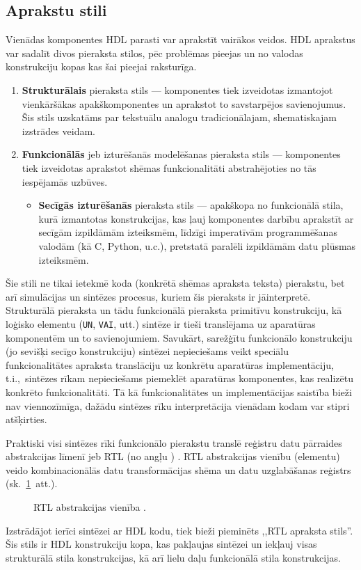 \subsection{Aprakstu stili} \label{sec:hdl-styles}
Vienādas komponentes HDL parasti var aprakstīt vairākos veidos.
HDL aprakstus var sadalīt divos pieraksta stilos, pēc problēmas pieejas un
no valodas konstrukciju kopas kas šai pieejai raksturīga.
\begin{enumerate}
	\item \textbf{Strukturālais} pieraksta stils --- komponentes tiek
		izveidotas izmantojot vienkāršākas apakškomponentes un aprakstot 
		to savstarpējos
		savienojumus. Šis stils uzskatāms par tekstuālu analogu
		tradicionālajam, shematiskajam izstrādes veidam.
	\item \textbf{Funkcionālās} jeb izturēšanās modelēšanas pieraksta
		stils --- komponentes tiek izveidotas aprakstot shēmas funkcionalitāti
		abstrahējoties no tās iespējamās uzbūves.
	\begin{itemize}
		\item \textbf{Secīgās izturēšanās} pieraksta stils --- apakškopa
			no funkcionālā stila, kurā izmantotas konstrukcijas, kas ļauj
			komponentes darbību aprakstīt ar secīgām izpildāmām izteiksmēm,
			līdzīgi imperatīvām programmēšanas valodām (kā C, Python, u.c.),
			pretstatā paralēli izpildāmām datu plūsmas izteiksmēm.
	\end{itemize}
\end{enumerate}

Šie stili ne tikai ietekmē koda (konkrētā shēmas apraksta teksta) pierakstu,
bet arī simulācijas un sintēzes procesus, kuriem šis pieraksts ir jāinterpretē.
Strukturālā pieraksta un tādu funkcionālā pieraksta primitīvu konstrukciju,
kā loģisko elementu (\texttt{UN}, \texttt{VAI}, utt.)
sintēze ir tieši translējama uz aparatūras komponentēm un to savienojumiem.
Savukārt, sarežģītu funkcionālo konstrukciju (jo sevišķi secīgo
konstrukciju) sintēzei nepieciešams veikt speciālu funkcionalitātes apraksta
translāciju uz konkrētu aparatūras implementāciju, t.i.,~sintēzes rīkam nepieciešams
piemeklēt aparatūras komponentes, kas realizētu konkrēto funkcionalitāti.
Tā kā funkcionalitātes un implementācijas saistība bieži nav viennozīmīga,
dažādu sintēzes rīku interpretācija vienādam kodam var stipri atšķirties.

Praktiski visi sintēzes rīki funkcionālo pierakstu translē %
reģistru datu pārraides abstrakcijas līmenī jeb RTL
(no angļu ) \cite[2.~lpp.]{HDL}%
\cite[235.~lpp.]{Perry-VHDL}.
RTL abstrakcijas vienību (elementu) veido kombinacionālās datu transformācijas shēma un
datu uzglabāšanas reģistrs (sk.~\ref{fig:rtl}~att.).
\begin{figure}[thb]
	\centering
	\def\svgscale{1.25}
	
	\caption[RTL abstrakcijas vienība.]{RTL abstrakcijas vienība \cite[233.~lpp.]{Perry-VHDL}.}
	\label{fig:rtl}
\end{figure}
Izstrādājot ierīci sintēzei ar HDL kodu, tiek bieži pieminēts
,,RTL apraksta stils''. Šis stils ir HDL konstrukciju kopa, kas
pakļaujas sintēzei un iekļauj visas strukturālā stila konstrukcijas, kā arī
lielu daļu funkcionālā stila konstrukcijas.

